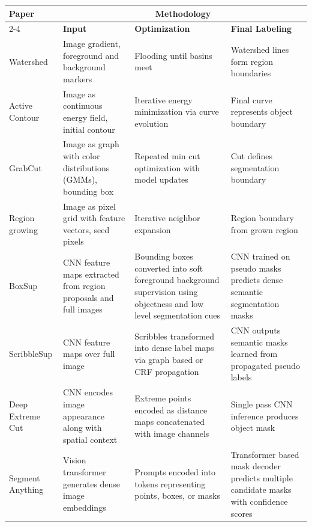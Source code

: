 \begin{table}[H]
	\centering
	\begin{tabular}{|p{3cm}|p{4cm}|p{4cm}|p{4cm}|}
		\hline
		\multirow{2}{*}{\textbf{Paper}} &
		\multicolumn{3}{|c|}{\textbf{Methodology}} \\
		\cline{2-4}
		&
		\textbf{Input} &
		\textbf{Optimization} &
		\textbf{Final Labeling} \\ \hline
		Watershed &
		Image gradient, foreground and background markers &
		Flooding until basins meet &
		Watershed lines form region boundaries \\ \hline
		Active Contour &
		Image as continuous energy field, initial contour &
		Iterative energy minimization via curve evolution &
		Final curve represents object boundary \\ \hline
		GrabCut &
		Image as graph with color distributions (GMMs), bounding box &
		Repeated min cut optimization with model updates &
		Cut defines segmentation boundary \\ \hline
		Region growing &
		Image as pixel grid with feature vectors, seed pixels &
		Iterative neighbor expansion &
		Region boundary from grown region \\ \hline
		BoxSup &
		CNN feature maps extracted from region proposals and full images &
		Bounding boxes converted into soft foreground background supervision using objectness and low level segmentation cues &
		CNN trained on pseudo masks predicts dense semantic segmentation masks \\ \hline
		ScribbleSup &
		CNN feature maps over full image &
		Scribbles transformed into dense label maps via graph based or CRF propagation &
		CNN outputs semantic masks learned from propagated pseudo labels \\ \hline
		Deep Extreme Cut &
		CNN encodes image appearance along with spatial context &
		Extreme points encoded as distance maps concatenated with image channels &
		Single pass CNN inference produces object mask \\ \hline
		Segment Anything &
		Vision transformer generates dense image embeddings &
		Prompts encoded into tokens representing points, boxes, or masks &
		Transformer based mask decoder predicts multiple candidate masks with confidence scores \\ \hline
	\end{tabular}
\end{table}

